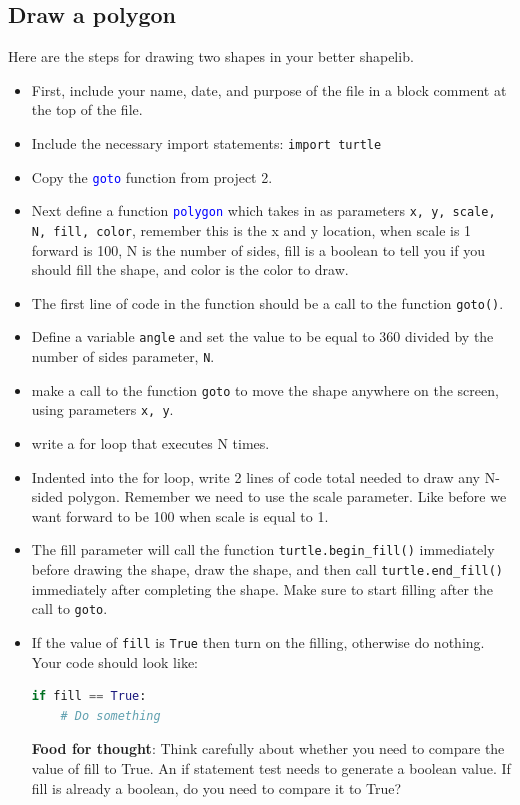 \documentclass[12pt]{article}
\begin{document}
\subsection{Draw a polygon}
Here are the steps for drawing two shapes in your better shapelib. 
\begin{itemize}
  \item First, include your name, date, and purpose of the file in a block comment at the top of the file.
\item Include the necessary import statements: \texttt{import turtle}
\item Copy the \textcolor{blue}{\texttt{goto}} function from project 2.  
\item Next define a function \textcolor{blue}{\texttt{polygon}} which takes in as parameters \texttt{x, y, scale, N, fill, color}, remember this is the x and y location, when scale is 1 forward is 100, N is the number of sides, fill is a boolean to tell you if you should fill the shape, and color is the color to draw.
\item The first line of code in the function should be a call to the function \texttt{goto()}. 
\item Define a variable \texttt{angle} and set the value to be equal to 360 divided by the number of sides parameter, \texttt{N}.
\item make a call to the function \texttt{goto} to move the shape anywhere on the screen, using parameters \texttt{x, y}.
\item write a for loop that executes N times. 
\item Indented into the for loop, write 2  lines of code total needed to draw any N-sided polygon. Remember we need to use the scale parameter. Like before we want forward to be 100 when scale is equal to 1. 
\item The fill parameter will call the function \texttt{turtle.begin\_fill()} immediately before drawing the shape, draw the shape, and then call \texttt{turtle.end\_fill()} immediately after completing the shape. Make sure to start filling after the call to \texttt{goto}.
\item If the value of \texttt{fill} is \texttt{True} then turn on the filling, otherwise do nothing. Your code should look like:
  \begin{lstlisting}[language=Python]
if fill == True:
    # Do something
    \end{lstlisting}
  \textbf{Food for thought}: Think carefully about whether you need to compare the value of fill to True. An if statement test needs to generate a boolean value. If fill is already a boolean, do you need to compare it to True?

\end{itemize}
\end{document}
